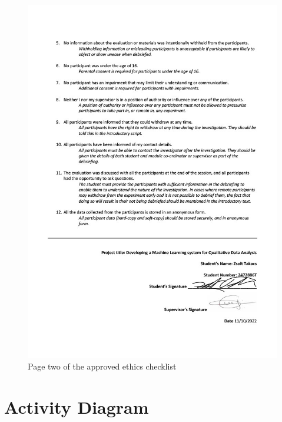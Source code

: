 \documentclass{l4proj}
\begin{document}
\begin{appendices}
\begin{figure}[H]
\centering
    \includegraphics[width=0.95\linewidth]{images/Zsolt Takacs 2472886T Ethics Checklist1024_2.jpg}
    \caption{Page two of the approved ethics checklist}
    \label{fig:ethics_2} 
\end{figure}

\chapter{Activity Diagram}
\label{appendix:b}


\end{appendices}
\end{document}
